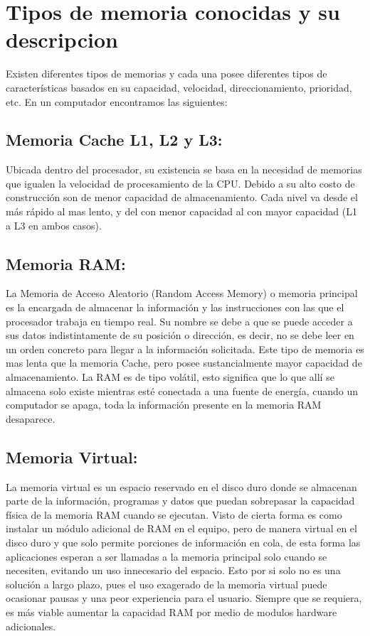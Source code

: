 \documentclass{article}
\begin{document}
\section{Tipos de memoria conocidas y su descripcion} \label{types}
Existen diferentes tipos de memorias y cada una posee diferentes tipos de características basados en su capacidad, velocidad, direccionamiento, prioridad, etc. En un computador encontramos las siguientes:

\subsection{Memoria Cache L1, L2 y L3: }
Ubicada dentro del procesador, su existencia se basa en la necesidad de memorias que igualen la velocidad de procesamiento de la CPU. Debido a su alto costo de construcción son de menor capacidad de almacenamiento. Cada nivel va desde el más rápido al mas lento, y del con menor capacidad al con mayor capacidad (L1 a L3 en ambos casos). \cite{augusto}

\subsection{Memoria RAM: }
La Memoria de Acceso Aleatorio (Random Access Memory) o memoria principal es la encargada de almacenar la información y las instrucciones con las que el procesador trabaja en tiempo real. Su nombre se debe a que se puede acceder a sus datos indistintamente de su posición o dirección, es decir, no se debe leer en un orden concreto para llegar a la información solicitada. Este tipo de memoria es mas lenta que la memoria Cache, pero posee sustancialmente mayor capacidad de almacenamiento. La RAM es de tipo volátil, esto significa que lo que allí se almacena solo existe mientras esté conectada a una fuente de energía, cuando un computador se apaga, toda la información presente en la memoria RAM desaparece.

\subsection{Memoria Virtual: }
La memoria virtual es un espacio reservado en el disco duro donde se almacenan parte de la información, programas y datos que puedan sobrepasar la capacidad física de la memoria RAM cuando se ejecutan. Visto de cierta forma es como instalar un módulo adicional de RAM en el equipo, pero de manera virtual en el disco duro y que solo permite porciones de información en cola, de esta forma las aplicaciones esperan a ser llamadas a la memoria principal solo cuando se necesiten, evitando un uso innecesario del espacio. Esto por si solo no es una solución a largo plazo, pues el uso exagerado de la memoria virtual puede ocasionar pausas y una peor experiencia para el usuario. Siempre que se requiera, es más viable aumentar la capacidad RAM por medio de modulos hardware adicionales.
\end{document}
